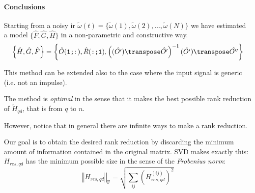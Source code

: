 \paragraph{Conclusions} Starting from a noisy \gls{ir} $\widetilde{\omega}(t) = \{\widetilde{\omega}(1), \widetilde{\omega}(2), \ldots, \widetilde{\omega}(N)\}$ we have estimated a model $\{\hat{F}, \hat{G}, \hat{H}\}$ in a non-parametric and constructive way.
\[ \left\{\hat{H}, \hat{G}, \hat{F} \right\} = \left \{\hat{O}(\texttt{1;:}), \hat{R}(\texttt{:;1}), \left((\hat{O'})\transpose\hat{O'}\right)^{-1} (\hat{O'})\transpose\hat{O''} \right \}\]

\begin{rem}
    This method can be extended also to the case where the input signal is generic (i.e. not an impulse).
\end{rem}

\begin{rem}
    The method is \emph{optimal} in the sense that it makes the best possible rank reduction of $\tilde{H}_{qd}$, that is from $q$ to $n$.
    
    However, notice that in general there are infinite ways to make a rank reduction.
\end{rem}

\begin{rem}
    Our goal is to obtain the desired rank reduction by discarding the minimum amount of information contained in the original matrix.
    SVD makes exactly this: $H_{res,qd}$ has the minimum possible size in the sense of the \emph{Frobenius norm}:
    \[
        \left\Vert H_{res,qd} \right\Vert_\text{F} = \sqrt{\sum_{ij} \left(H_{res,qd}^{(ij)} \right)^2}
    \]   
\end{rem}

